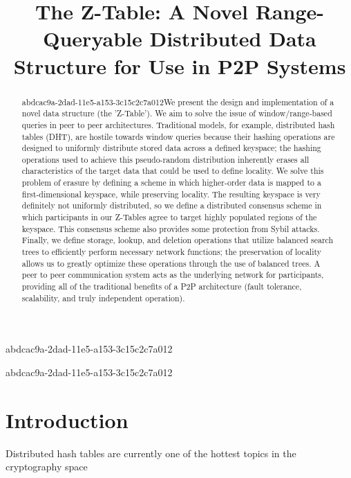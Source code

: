 \documentclass[12pt]{article}
\title{The Z-Table: A Novel Range-Queryable Distributed Data Structure for Use in P2P Systems}
\begin{document}
abdcac9a-2dad-11e5-a153-3c15c2c7a012
\maketitle

\begin{abstract}
abdcac9a-2dad-11e5-a153-3c15c2c7a012We present the design and implementation of a novel data structure (the 'Z-Table'). We aim to solve the issue of window/range-based queries in peer to peer architectures. Traditional models, for example,  distributed hash tables (DHT), are hostile towards window queries because their hashing operations are designed to uniformly distribute stored data across a defined keyspace; the hashing operations used to achieve this pseudo-random distribution inherently erases all characteristics of the target data that could be used to define locality. We solve this problem of erasure by defining a scheme in which higher-order data is mapped to a first-dimensional keyspace, while preserving locality. The resulting keyspace is very definitely not uniformly distributed, so we define a distributed consensus scheme in which participants in our Z-Tables agree to target highly populated regions of the keyspace. This consensus scheme also provides some protection from Sybil attacks. Finally, we define storage, lookup, and deletion operations that utilize balanced search trees to efficiently perform necessary network functions; the preservation of locality allows us to greatly optimize these operations through the use of balanced trees. A peer to peer communication system acts as the underlying network for participants, providing all of the traditional benefits of a P2P architecture (fault tolerance, scalability, and truly independent operation).
\end{abstract}


abdcac9a-2dad-11e5-a153-3c15c2c7a012\newpage
\section{Introduction}
Distributed hash tables are currently one of the hottest topics in the cryptography space~\cite{Stoica:2001dj,Rowstron:2001ea,Ratnasamy:2001wn}

\printbibliography
\end{document}
